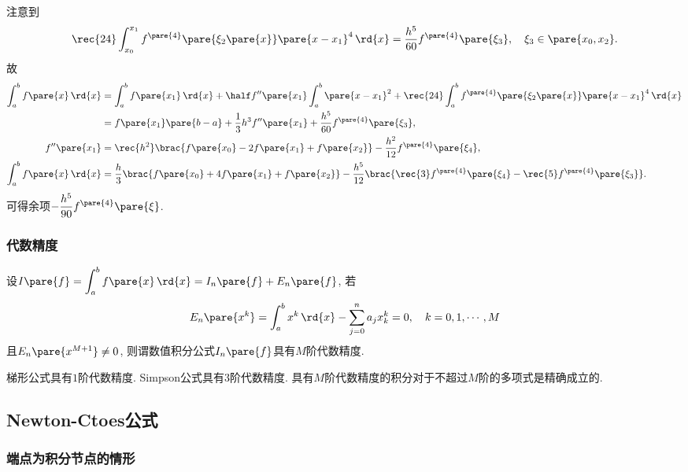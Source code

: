 \documentclass[hidelinks]{ctexart}
\begin{document}
注意到
\[ \rec{24}\int_{x_0}^{x_1} f^{\pare{4}}\pare{\xi_2\pare{x}}\pare{x-x_1}^4\,\rd{x} = \frac{h^5}{60}f^{\pare{4}}\pare{\xi_3},\quad \xi_3 \in\pare{x_0,x_2}. \]
故
\begin{align*}
    \int_a^b f\pare{x}\,\rd{x} &= \int_a^b f\pare{x_1} \,\rd{x} + \half f''\pare{x_1} \int_a^b \pare{x-x_1}^2 + \rec{24}\int_a^b {f^{\pare{4}}\pare{\xi_2\pare{x}}}\pare{x-x_1}^4\,\rd{x} \\
    &= f\pare{x_1}\pare{b-a} + \frac{1}{3}h^3 f''\pare{x_1} + \frac{h^5}{60} f^{\pare{4}}\pare{\xi_3}, \\
    f''\pare{x_1} &= \rec{h^2}\brac{f\pare{x_0} - 2f\pare{x_1} + f\pare{x_2}}  - \frac{h^2}{12}f^{\pare{4}}\pare{\xi_4}, \\
    \int_a^b f\pare{x}\,\rd{x} &= \frac{h}{3} \brac{f\pare{x_0} + 4f\pare{x_1} + f\pare{x_2}} - \frac{h^5}{12} \brac{\rec{3}f^{\pare{4}}\pare{\xi_4} - \rec{5}f^{\pare{4}}\pare{\xi_3}}.
\end{align*}
可得余项$\displaystyle -\frac{h^5}{90}f^{\pare{4}}\pare{\xi}$.

\subsubsection{代数精度} %
\label{ssub:代数精度}

\begin{definition}
    设$\displaystyle I\pare{f} = \int_a^b f\pare{x}\,\rd{x} = I_n\pare{f} + E_n\pare{f}$, 若
    \[ E_n\pare{x^k} = \int_a^b x^k \,\rd{x} - \sum_{j=0}^n a_j x_k^k = 0,\quad k = 0,1,\cdots,M \]
    且$E_n\pare{x^{M+1}} \neq 0$, 则谓数值积分公式$I_n\pare{f}$具有$M$阶代数精度.
\end{definition}
梯形公式具有$1$阶代数精度. Simpson公式具有$3$阶代数精度.
\newpoint{}具有$M$阶代数精度的积分对于不超过$M$阶的多项式是精确成立的.



\subsection{Newton-Ctoes公式} %
\label{sub:newton_ctoes公式}

\subsubsection{端点为积分节点的情形} %
\label{ssub:端点为积分节点的情形}
\end{document}
